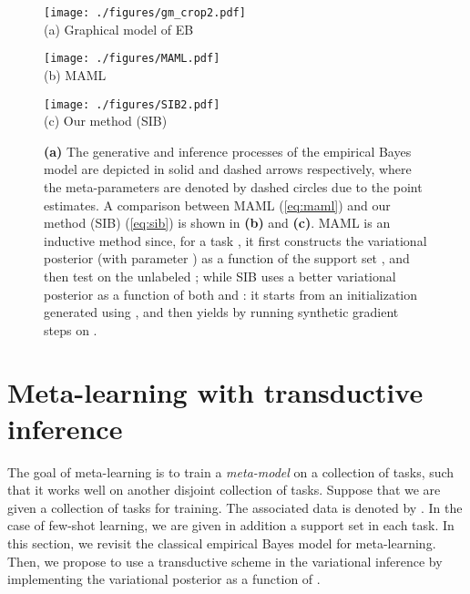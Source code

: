 \documentclass{article} \usepackage{iclr2020_conference,times}
\def\eqref#1{(\ref{#1})}
\begin{document}
\begin{figure*}[t]
	\centering
	\begin{minipage}{.28\textwidth}
		\centering
		\texttt{[image: ./figures/gm\_crop2.pdf]}\\
        (a) Graphical model of EB
	\end{minipage}
	\hfill
	\begin{minipage}{.35\textwidth}
		\centering
		\texttt{[image: ./figures/MAML.pdf]}\\
        (b) MAML
	\end{minipage} 
	\hfill
	\begin{minipage}{.35\textwidth}
		\centering
		\texttt{[image: ./figures/SIB2.pdf]}\\
        (c) Our method (SIB)
	\end{minipage}
    \caption{\textbf{(a)} The generative and inference processes of the empirical Bayes model 
    are depicted in solid and dashed arrows respectively, 
    where the meta-parameters are denoted by dashed circles due to the point estimates.
    A comparison between MAML \eqref{eq:maml} and our method (SIB) \eqref{eq:sib} is shown in \textbf{(b)} and \textbf{(c)}.
    MAML is an inductive method since, for a task , it first constructs the variational posterior (with parameter ) as a function of the support set ,
    and then test on the unlabeled ; while SIB uses a better variational posterior as a function of both  and :
    it starts from an initialization  generated using , and then yields  by running  synthetic gradient steps on .
    }
\label{fig:intro}
\end{figure*}


 \section{Meta-learning with transductive inference}
\label{sec:model}

The goal of meta-learning is to train a \emph{meta-model} on a collection of tasks,
such that it works well on another disjoint collection of tasks.
Suppose that we are given a collection of  tasks for training. 
The associated data is denoted by . 
In the case of few-shot learning, 
we are given in addition a support set  in each task. 
In this section, we revisit the classical empirical Bayes model for meta-learning. Then, 
we propose to use a transductive scheme in the variational inference by implementing the variational posterior as a function of . 
\end{document}
